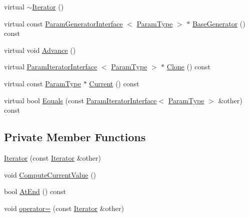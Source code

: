 \begin{DoxyCompactItemize}
\item 
virtual \hyperlink{classtesting_1_1internal_1_1CartesianProductGenerator10_1_1Iterator_a47b331bac1d130f2bab2c40e76ccb54a}{$\sim$\-Iterator} ()
\item 
virtual const \*
\hyperlink{classtesting_1_1internal_1_1ParamGeneratorInterface}{\-Param\-Generator\-Interface}\*
$<$ \hyperlink{classtesting_1_1internal_1_1CartesianProductGenerator10_adffde37eb66ea6d9917ab9fd24b46926}{\-Param\-Type} $>$ $\ast$ \hyperlink{classtesting_1_1internal_1_1CartesianProductGenerator10_1_1Iterator_a297272d14c33d1d5423da2a4776f895b}{\-Base\-Generator} () const 
\item 
virtual void \hyperlink{classtesting_1_1internal_1_1CartesianProductGenerator10_1_1Iterator_aaa5a890708f89affa1a7726cf152c872}{\-Advance} ()
\item 
virtual \hyperlink{classtesting_1_1internal_1_1ParamIteratorInterface}{\-Param\-Iterator\-Interface}\*
$<$ \hyperlink{classtesting_1_1internal_1_1CartesianProductGenerator10_adffde37eb66ea6d9917ab9fd24b46926}{\-Param\-Type} $>$ $\ast$ \hyperlink{classtesting_1_1internal_1_1CartesianProductGenerator10_1_1Iterator_a4bee4982ee1152c6935ffd0c2d749421}{\-Clone} () const 
\item 
virtual const \hyperlink{classtesting_1_1internal_1_1CartesianProductGenerator10_adffde37eb66ea6d9917ab9fd24b46926}{\-Param\-Type} $\ast$ \hyperlink{classtesting_1_1internal_1_1CartesianProductGenerator10_1_1Iterator_ab27aeab5db14a30f077a37989ce9261c}{\-Current} () const 
\item 
virtual bool \hyperlink{classtesting_1_1internal_1_1CartesianProductGenerator10_1_1Iterator_a8f18f9a017a12730cce28c07460bbc14}{\-Equals} (const \hyperlink{classtesting_1_1internal_1_1ParamIteratorInterface}{\-Param\-Iterator\-Interface}$<$ \hyperlink{classtesting_1_1internal_1_1CartesianProductGenerator10_adffde37eb66ea6d9917ab9fd24b46926}{\-Param\-Type} $>$ \&other) const 
\end{DoxyCompactItemize}
\subsection*{\-Private \-Member \-Functions}
\begin{DoxyCompactItemize}
\item 
\hyperlink{classtesting_1_1internal_1_1CartesianProductGenerator10_1_1Iterator_a2b76c2e597bc9393f2b99e869e4fa8d2}{\-Iterator} (const \hyperlink{classtesting_1_1internal_1_1CartesianProductGenerator10_1_1Iterator}{\-Iterator} \&other)
\item 
void \hyperlink{classtesting_1_1internal_1_1CartesianProductGenerator10_1_1Iterator_a4c18cbbef042bab72ed484f5b6923908}{\-Compute\-Current\-Value} ()
\item 
bool \hyperlink{classtesting_1_1internal_1_1CartesianProductGenerator10_1_1Iterator_a6eb9b47ffa4b10f0dca403fc597faba0}{\-At\-End} () const 
\item 
void \hyperlink{classtesting_1_1internal_1_1CartesianProductGenerator10_1_1Iterator_ac087d740f6aa05ec07afd0c5c0327105}{operator=} (const \hyperlink{classtesting_1_1internal_1_1CartesianProductGenerator10_1_1Iterator}{\-Iterator} \&other)
\end{DoxyCompactItemize}
